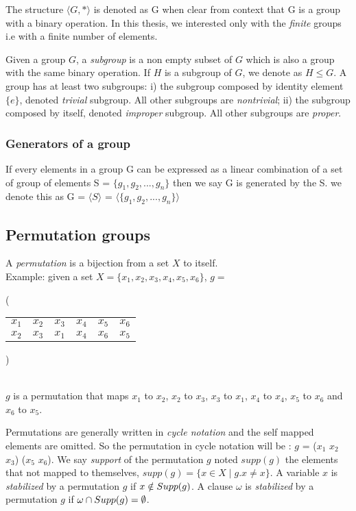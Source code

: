 The structure $\langle G, * \rangle$ is denoted as G when clear from context that G is a group
with a binary operation. In this thesis, we interested only with the \emph{finite} groups i.e
with a finite number of elements.

Given a group $G$, a \emph{subgroup} is a non empty subset of $G$ which is also a group with 
the same binary operation. If $H$ is a subgroup of $G$, we denote as $H \leq G$.
A group has at least two subgroups: i) the subgroup composed by identity element $\{e\}$, denoted \emph{trivial} subgroup. All other subgroups are \emph{nontrivial}; ii) the subgroup composed by itself, denoted \emph{improper} subgroup. All other subgroups are \emph{proper}.


\subsubsection{Generators of a group}

If every elements in a group G can be expressed as a linear combination
of a set of group of elements S = $\{g_1, g_2, ..., g_n \}$ then we say G is 
generated by the S. we denote this as G = $\langle S \rangle$ =
$\langle \{g_1, g_2, ..., g_n \} \rangle$ 



\subsection{Permutation groups}
 
A \emph{permutation} is a bijection from a set $X$ to itself.\\
 Example: given a set $X = \{x_1, x_2, x_3, x_4, x_5, x_6\}$,
$g = ${\Bigg( \begin{tabular}{cccccc}
		$x_1$ & $x_2$ & $x_3$ & $x_4$ & $x_5$ & $x_6$\\
		$x_2$ & $x_3$ & $x_1$ & $x_4$ & $x_6$ & $x_5$
	\end{tabular} \Bigg)}\\
$g$ is a permutation that maps $x_1$ to $x_2$, $x_2$ to $x_3$, $x_3$ to $x_1$, $x_4$ to $x_4$, $x_5$ to $x_6$ and $x_6$ to $x_5$.

Permutations are generally written in \emph{cycle notation} and the self mapped elements are omitted.
So the permutation in cycle notation will be : $g$ = ($x_1$ $x_2$ $x_3$) ($x_5$ $x_6$).
We say \emph{support} of the permutation $g$ noted $supp(g)$ the elements that not mapped to themselves,
$supp(g) = \{ x \in X \mid g.x \neq x\}$. A variable $x$ is \emph{stabilized} by a permutation $g$ 
if $x \notin Supp(g)$. A clause $\omega$ is \emph{stabilized} by a permutation $g$ if 
$\omega \cap Supp(g) = \emptyset$. 



